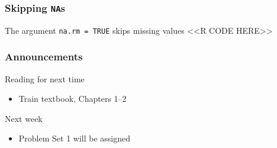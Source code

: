 \documentclass{beamer}
\begin{document}
\begin{frame}\frametitle[fragile]{Skipping \texttt{NA}s}
    The argument \texttt{na.rm = TRUE} skips missing values
    <<R CODE HERE>>
\end{frame}

\begin{frame}\frametitle{Announcements}
    Reading for next time
    \begin{itemize}
        \item Train textbook, Chapters 1--2
    \end{itemize}
    \vspace{3ex}
    Next week
    \begin{itemize}
        \item Problem Set 1 will be assigned
    \end{itemize}
\end{frame}
\end{document}
